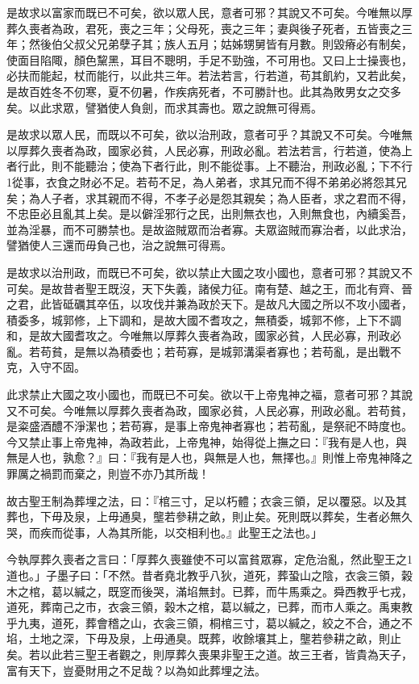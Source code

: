 \begin{pinyinscope}
是故求以富家而既已不可矣，欲以眾人民，意者可邪？其說又不可矣。今唯無以厚葬久喪者為政，君死，喪之三年；父母死，喪之三年；妻與後子死者，五皆喪之三年；然後伯父叔父兄弟孽子其；族人五月；姑姊甥舅皆有月數。則毀瘠必有制矣，使面目陷陬，顏色黧黑，耳目不聰明，手足不勁強，不可用也。又曰上士操喪也，必扶而能起，杖而能行，以此共三年。若法若言，行若道，苟其飢約，又若此矣，是故百姓冬不仞寒，夏不仞暑，作疾病死者，不可勝計也。此其為敗男女之交多矣。以此求眾，譬猶使人負劍，而求其壽也。眾之說無可得焉。

是故求以眾人民，而既以不可矣，欲以治刑政，意者可乎？其說又不可矣。今唯無以厚葬久喪者為政，國家必貧，人民必寡，刑政必亂。若法若言，行若道，使為上者行此，則不能聽治；使為下者行此，則不能從事。上不聽治，刑政必亂；下不行1從事，衣食之財必不足。若苟不足，為人弟者，求其兄而不得不弟弟必將怨其兄矣；為人子者，求其親而不得，不孝子必是怨其親矣；為人臣者，求之君而不得，不忠臣必且亂其上矣。是以僻淫邪行之民，出則無衣也，入則無食也，內續奚吾，並為淫暴，而不可勝禁也。是故盜賊眾而治者寡。夫眾盜賊而寡治者，以此求治，譬猶使人三還而毋負己也，治之說無可得焉。

是故求以治刑政，而既已不可矣，欲以禁止大國之攻小國也，意者可邪？其說又不可矣。是故昔者聖王既沒，天下失義，諸侯力征。南有楚、越之王，而北有齊、晉之君，此皆砥礪其卒伍，以攻伐并兼為政於天下。是故凡大國之所以不攻小國者，積委多，城郭修，上下調和，是故大國不耆攻之，無積委，城郭不修，上下不調和，是故大國耆攻之。今唯無以厚葬久喪者為政，國家必貧，人民必寡，刑政必亂。若苟貧，是無以為積委也；若苟寡，是城郭溝渠者寡也；若苟亂，是出戰不克，入守不固。

此求禁止大國之攻小國也，而既已不可矣。欲以干上帝鬼神之褔，意者可邪？其說又不可矣。今唯無以厚葬久喪者為政，國家必貧，人民必寡，刑政必亂。若苟貧，是粢盛酒醴不淨潔也；若苟寡，是事上帝鬼神者寡也；若苟亂，是祭祀不時度也。今又禁止事上帝鬼神，為政若此，上帝鬼神，始得從上撫之曰：『我有是人也，與無是人也，孰愈？』曰：『我有是人也，與無是人也，無擇也。』則惟上帝鬼神降之罪厲之禍罰而棄之，則豈不亦乃其所哉！

故古聖王制為葬埋之法，曰：『棺三寸，足以朽體；衣衾三領，足以覆惡。以及其葬也，下毋及泉，上毋通臭，壟若參耕之畝，則止矣。死則既以葬矣，生者必無久哭，而疾而從事，人為其所能，以交相利也。』此聖王之法也。」

今執厚葬久喪者之言曰：「厚葬久喪雖使不可以富貧眾寡，定危治亂，然此聖王之1道也。」子墨子曰：「不然。昔者堯北教乎八狄，道死，葬蛩山之陰，衣衾三領，榖木之棺，葛以緘之，既窆而後哭，滿埳無封。已葬，而牛馬乘之。舜西教乎七戎，道死，葬南己之市，衣衾三領，榖木之棺，葛以緘之，已葬，而市人乘之。禹東教乎九夷，道死，葬會稽之山，衣衾三領，桐棺三寸，葛以緘之，絞之不合，通之不埳，土地之深，下毋及泉，上毋通臭。既葬，收餘壤其上，壟若參耕之畝，則止矣。若以此若三聖王者觀之，則厚葬久喪果非聖王之道。故三王者，皆貴為天子，富有天下，豈憂財用之不足哉？以為如此葬埋之法。


\end{pinyinscope}
